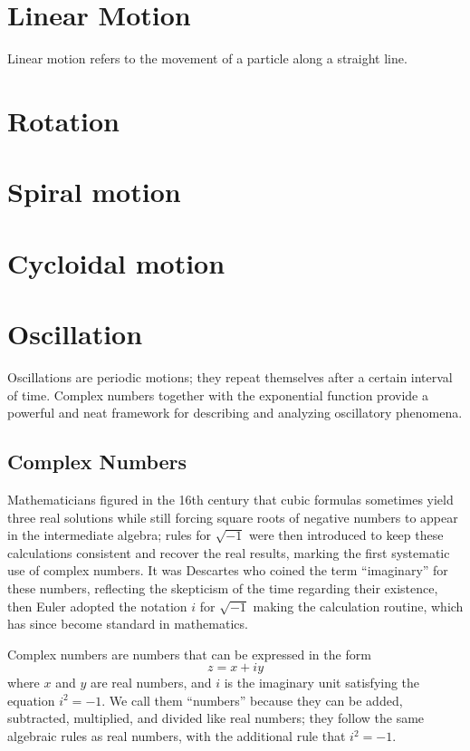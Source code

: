 \documentclass[12pt,oneside]{book}
\numberwithin{equation}{chapter}
\begin{document}
\section{Linear Motion}
Linear motion refers to the movement of a particle along a straight line.

\section{Rotation}

\section{Spiral motion}

\section{Cycloidal motion}



\section{Oscillation}

Oscillations are periodic motions; they repeat themselves after a certain interval of time. Complex numbers together with the exponential function provide a powerful and neat framework for describing and analyzing oscillatory phenomena.

\subsection*{Complex Numbers}

Mathematicians figured in the 16th century that cubic formulas sometimes yield three real solutions while still forcing square roots of negative numbers to appear in the intermediate algebra; rules for $\sqrt{-1}$ were then introduced to keep these calculations consistent and recover the real results, marking the first systematic use of complex numbers. It was Descartes who coined the term ``imaginary'' for these numbers, reflecting the skepticism of the time regarding their existence, then Euler adopted the notation $i$ for $\sqrt{-1}$ making the calculation routine, which has since become standard in mathematics.

Complex numbers are numbers that can be expressed in the form 
\begin{equation}
    z = x + iy
\end{equation}
where $x$ and $y$ are real numbers, and $i$ is the imaginary unit satisfying the equation $i^2 = -1$. We call them ``numbers'' because they can be added, subtracted, multiplied, and divided like real numbers; they follow the same algebraic rules as real numbers, with the additional rule that $i^2 = -1$.
\end{document}

